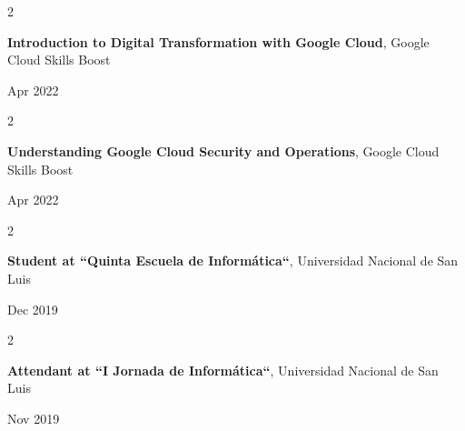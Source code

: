 \documentclass[10pt, letterpaper]{article}
\newenvironment{twocolentry}[2][]{
    \onecolentry
    \def\secondColumn{#2}
    \setcolumnwidth{\fill, 4.5 cm}
    \begin{paracol}{2}
}{
    \switchcolumn \raggedleft \secondColumn
    \end{paracol}
    \endonecolentry
} %
\begin{document}
    \begin{twocolentry}{
            Apr 2022
        }
        \textbf{Introduction to Digital Transformation with Google Cloud}, Google Cloud Skills Boost
    \end{twocolentry}
    \begin{twocolentry}{
            Apr 2022
        }
        \textbf{Understanding Google Cloud Security and Operations}, Google Cloud Skills Boost
    \end{twocolentry}
    \begin{twocolentry}{
            Dec 2019
        }
        \textbf{Student at “Quinta Escuela de Informática“}, Universidad Nacional de San Luis
    \end{twocolentry}
    \begin{twocolentry}{
            Nov 2019
        }
        \textbf{Attendant at “I Jornada de Informática“}, Universidad Nacional de San Luis
    \end{twocolentry}
\end{document}
